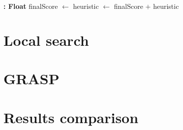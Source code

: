 \documentclass{article}
\begin{document}
\begin{algorithmic}[H]
 \textbf{: Float}
    \State finalScore $\gets$ 
    \State heuristic $\gets$ 
    \State \Return finalScore $+$ heuristic
\EndFunction
\end{algorithmic}

\begin{algorithmic}[H]
\State {}
\end{algorithmic}

\section{Local search}
\section{GRASP}
\section{Results comparison}
\end{document}
